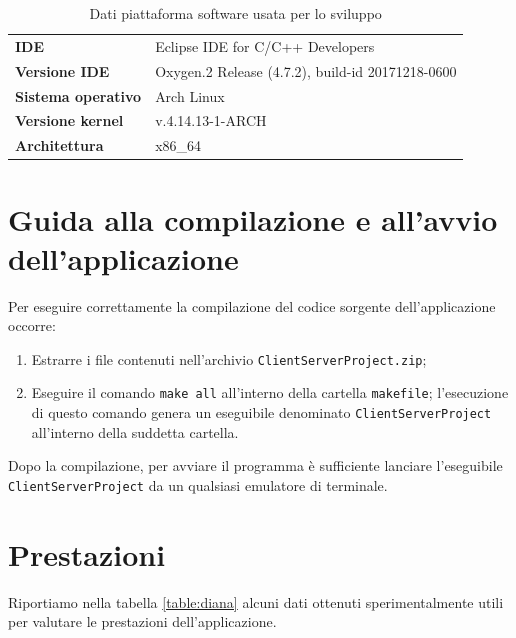 \documentclass[10pt,a4paper, titlepage]{report}
\begin{document}
\begin{table}[H]
\caption{Dati piattaforma software usata per lo sviluppo}\label{table:akko}
\begin{center}
\begin{tabular}{ll}

\toprule

\textbf{IDE} & Eclipse IDE for C/C++ Developers \\
\textbf{Versione IDE} & Oxygen.2 Release (4.7.2), build-id 20171218-0600	\\
\textbf{Sistema operativo} & Arch Linux \\
\textbf{Versione kernel} & v.4.14.13-1-ARCH \\
\textbf{Architettura} & x86\_64 \\

\bottomrule
\end{tabular}
\end{center}
\end{table}

\section{Guida alla compilazione e all'avvio dell'applicazione}

Per eseguire correttamente la compilazione del codice sorgente dell'applicazione occorre:

\begin{enumerate}
\item Estrarre i file contenuti nell'archivio \texttt{ClientServerProject.zip};
\item Eseguire il comando \texttt{make all} all'interno della cartella \texttt{makefile}; l'esecuzione di questo comando genera un eseguibile denominato \texttt{ClientServerProject} all'interno della suddetta cartella.
\end{enumerate}

Dopo la compilazione, per avviare il programma è sufficiente lanciare l'eseguibile \texttt{ClientServerProject} da un qualsiasi emulatore di terminale.
\newpage
\section{Prestazioni}

Riportiamo nella tabella \ref{table:diana} alcuni dati ottenuti sperimentalmente utili per valutare le prestazioni dell'applicazione. 
\end{document}
